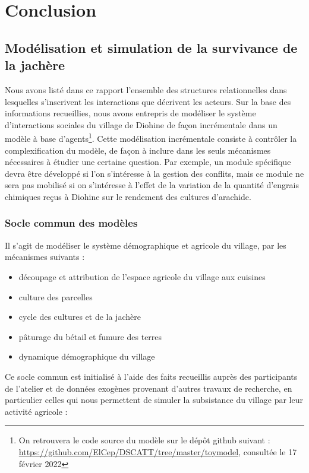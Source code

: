 \chapter{Conclusion}

\section{Modélisation et simulation de la survivance de la jachère}


Nous avons listé dans ce rapport l'ensemble des structures relationnelles dans lesquelles s'inscrivent les interactions que décrivent les acteurs.
Sur la base des informations recueillies, nous avons entrepris de modéliser le système d'interactions sociales du village de Diohine de façon incrémentale dans un modèle à base d'agents\footnote{On retrouvera le code source du modèle sur le dépôt github suivant : \url{https://github.com/ElCep/DSCATT/tree/master/toymodel}, consultée le 17 février 2022}.  Cette modélisation incrémentale consiste à contrôler la complexification du modèle, de façon à inclure dans les seuls mécanismes nécessaires à étudier une certaine question. Par exemple, un module spécifique devra être développé si l'on s'intéresse à la gestion des conflits, mais ce module ne sera pas mobilisé  si on s'intéresse à l'effet de la variation de la quantité d'engrais chimiques reçus à Diohine sur le rendement des cultures d'arachide.

\subsection{Socle commun des modèles}

Il s'agit de modéliser le système démographique et agricole du village, par les mécanismes suivants  :
\begin{itemize}
\item découpage et attribution de l'espace agricole du village aux cuisines
\item culture des parcelles
\item cycle des cultures et de la jachère
\item pâturage du bétail et fumure des terres
\item dynamique démographique du village
\end{itemize}


Ce socle commun est initialisé à l'aide des faits recueillis auprès des participants de l'atelier  et de données  exogènes provenant d'autres travaux de recherche, en particulier celles qui nous permettent de simuler la subsistance du village par leur activité agricole :


